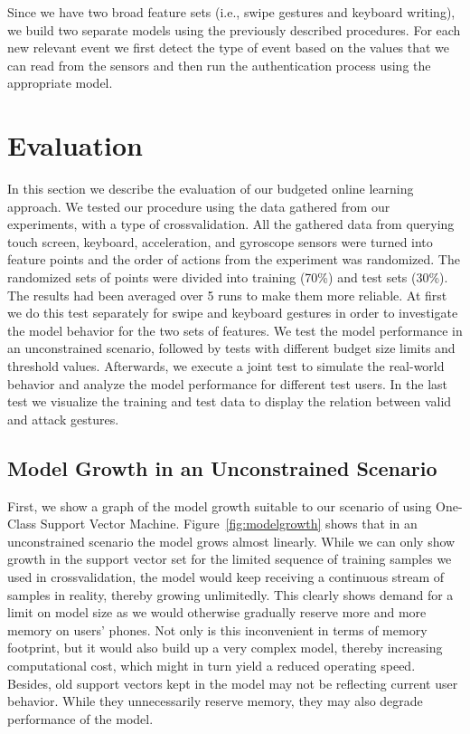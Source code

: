 \documentclass{llncs}
\begin{document}
Since we have two broad feature sets (i.e., swipe gestures and keyboard writing), we build two separate models using the previously described procedures. For each new relevant event we first detect the type of event based on the values that we can read from the sensors and then run the authentication process using the appropriate model.

\section{Evaluation}
\label{sec:evaluation}

In this section we describe the evaluation of our budgeted online learning approach. We tested our procedure using the data gathered from our experiments, with a type of crossvalidation. All the gathered data from querying touch screen, keyboard, acceleration, and gyroscope sensors were turned into feature points and the order of actions from the experiment was randomized. The randomized sets of points were divided into training (70\%) and test sets (30\%). The results had been averaged over 5 runs to make them more reliable. At first we do this test separately for swipe and keyboard gestures in order to investigate the model behavior for the two sets of features. We test the model performance in an unconstrained scenario, followed by tests with different budget size limits and threshold values. Afterwards, we execute a joint test to simulate the real-world behavior and analyze the model performance for different test users.  In the last test we visualize the training and test data to display the relation between valid and attack gestures. 

\subsection{Model Growth in an Unconstrained Scenario}

First, we show a graph of the model growth suitable to our scenario of using One-Class Support Vector Machine. Figure~\ref{fig:modelgrowth} shows that in an unconstrained scenario the model grows almost linearly. While we can only show growth in the support vector set for the limited sequence of training samples we used in crossvalidation, the model would keep receiving a continuous stream of samples in reality, thereby growing unlimitedly. This clearly shows demand for a limit on model size as we would otherwise gradually reserve more and more memory on users' phones. Not only is this inconvenient in terms of memory footprint, but it would also build up a very complex model, thereby increasing computational cost, which might in turn yield a reduced operating speed. Besides, old support vectors kept in the model may not be reflecting current user behavior. While they unnecessarily reserve memory, they may also degrade performance of the model.
\end{document}
